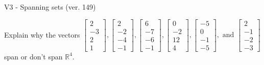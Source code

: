 \begin{exercise}
  \begin{exerciseTitle}V3 - Spanning sets (ver. 149)\end{exerciseTitle}
  \begin{exerciseStatement}
    Explain why the vectors \(\left[\begin{array}{r}
2 \\
-3 \\
2 \\
1
\end{array}\right] , \left[\begin{array}{r}
2 \\
-2 \\
-4 \\
-1
\end{array}\right] , \left[\begin{array}{r}
6 \\
-7 \\
-6 \\
-1
\end{array}\right] , \left[\begin{array}{r}
0 \\
-2 \\
12 \\
4
\end{array}\right] , \left[\begin{array}{r}
-5 \\
0 \\
-1 \\
-5
\end{array}\right] , \text{ and } \left[\begin{array}{r}
2 \\
-1 \\
-2 \\
-3
\end{array}\right]\) span or don't span \(\mathbb{R}^4\). 
	



\end{exerciseStatement}
\end{exercise}
